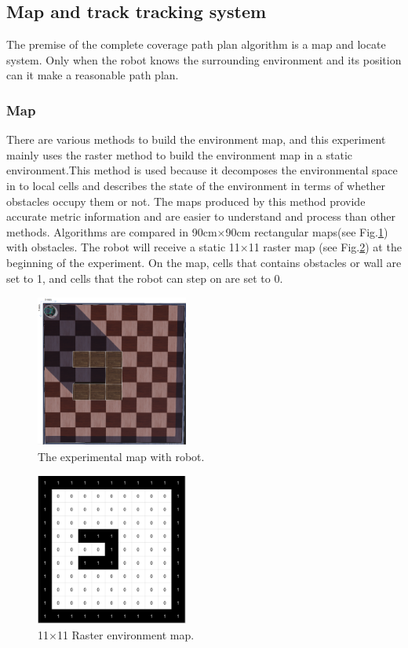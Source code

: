 \documentclass[conference]{IEEEtran}
\begin{document}
\subsection{Map and track tracking system}

The premise of the complete coverage path plan algorithm is a map and locate system. Only when the robot knows the surrounding environment and its position can it make a reasonable path plan.

\subsubsection{Map}

There are various methods to build the environment map, and this experiment mainly uses the raster method\cite{hart1968formal} to build the environment map in a static environment.This method is used because it decomposes the environmental space in to local cells and describes the state of the environment in terms of whether obstacles occupy them or not. The maps produced by this method provide accurate metric information and are easier to understand and process than other methods. Algorithms are compared in 90cm×90cm rectangular maps(see Fig.\ref{fig1}) with obstacles. The robot will receive a static 11×11 raster map (see Fig.\ref{fig2}) at the beginning of the experiment. On the map, cells that contains obstacles or wall are set to 1, and cells that the robot can step on are set to 0.

\begin{figure}[htbp]
\centerline{\includegraphics[width=5cm,height=5cm]{RS_Report/Webots_map.png}}
\caption{The experimental map with robot.}
\label{fig1}
\end{figure}

\begin{figure}[htbp]
\setlength{\belowcaptionskip}{-1cm}
\centerline{\includegraphics[width=5cm,height=5cm]{map.png}}
\caption{11$\times$11 Raster environment map.}
\label{fig2}
\end{figure}
\end{document}
